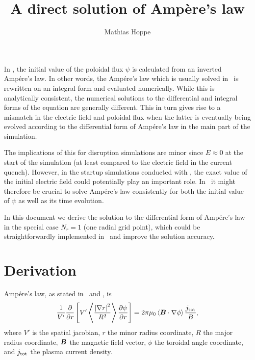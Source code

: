 \documentclass{notes}
\author{Mathias Hoppe}
\title{A direct solution of Ampère's law}
\begin{document}
    \maketitle

    \noindent
    In \DREAM, the initial value of the poloidal flux $\psi$ is calculated
    from an inverted Amp\'ere's law. In other words, the Amp\'ere's law which
    is usually solved in \DREAM\ is rewritten on an integral form and evaluated
    numerically. While this is analytically consistent, the numerical solutions
    to the differential and integral forms of the equation are generally
    different. This in turn gives rise to a mismatch in the electric field and
    poloidal flux when the latter is eventually being evolved according to the
    differential form of Amp\'ere's law in the main part of the simulation.

    The implications of this for disruption simulations are minor since
    $E\approx 0$ at the start of the simulation (at least compared to the
    electric field in the current quench). However, in the startup simulations
    conducted with \STREAM, the exact value of the initial electric field
    could potentially play an important role. In \STREAM\ it might therefore
    be crucial to solve Amp\'ere's law consistently for both the initial value
    of $\psi$ as well as its time evolution.

    In this document we derive the solution to the differential form of
    Amp\'ere's law in the special case $N_r = 1$ (one radial grid point), which
    could be straightforwardly implemented in \DREAM\ and improve the
    solution accuracy.

    \section*{Derivation}
    Amp\'ere's law, as stated in \DREAM\ and \STREAM, is
    \begin{equation}\label{eq:ampere}
        \frac{1}{V'}\frac{\partial}{\partial r}\left[
            V'\left\langle \frac{\left|\nabla r\right|^2}{R^2} \right\rangle
            \frac{\partial\psi}{\partial r}
        \right]
        = 2\pi\mu_0\left\langle\boldsymbol{B}\cdot\nabla\phi\right\rangle\frac{j_{\rm tot}}{B},
    \end{equation}
    where $V'$ is the spatial jacobian, $r$ the minor radius coordinate, $R$ the
    major radius coordinate, $\boldsymbol{B}$ the magnetic field vector, $\phi$ the
    toroidal angle coordinate, and $j_{\rm tot}$ the plasma current density.
\end{document}
